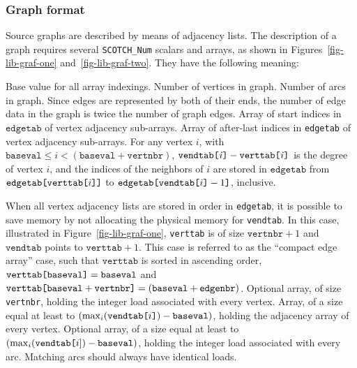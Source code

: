 \subsubsection{Graph format}
\label{sec-lib-format-graph}

Source graphs are described by means of adjacency lists. The
description of a graph requires several {\tt SCOTCH\_Num} scalars and
arrays, as shown in Figures~\ref{fig-lib-graf-one}
and~\ref{fig-lib-graf-two}. They have the following meaning:
\begin{itemize}
\iteme[{\tt baseval}]
Base value for all array indexings.
\iteme[{\tt vertnbr}]
Number of vertices in graph.
\iteme[{\tt edgenbr}]
Number of arcs in graph. Since edges are represented by both of their
ends, the number of edge data in the graph is twice the number of
graph edges.
\iteme[{\tt verttab}]
Array of start indices in $\mathtt{edgetab}$ of vertex adjacency
sub-arrays.
\iteme[{\tt vendtab}]
Array of after-last indices in {\tt edgetab} of vertex adjacency
sub-arrays.
For any vertex $i$, with $\mathtt{baseval} \leq i < (\mathtt{baseval}
+ \mathtt{vertnbr})$, $\mathtt{vendtab}\mbox{\tt [}\mathit{i}\mbox{\tt
]} - \mathtt{verttab}\mbox{\tt [}\mathit{i}\mbox{\tt ]}$ is the degree
of vertex $i$, and the indices of the neighbors of $i$ are stored in
$\mathtt{edgetab}$ from $\mathtt{edgetab}\lbt \mbox{\tt
[}\mathtt{verttab}\mbox{\tt [}i\mbox{\tt ]]}$ to
$\mathtt{edgetab}\lbt \mbox{\tt [}\mathtt{vendtab}\mbox{\tt
[}i\mbox{\tt ]} - 1\mbox{\tt ]}$, inclusive.

When all vertex adjacency lists are stored in order in {\tt edgetab},
it is possible to save memory by not allocating the physical memory
for {\tt vendtab}. In this case, illustrated in
Figure~\ref{fig-lib-graf-one}, {\tt verttab} is of size
$\mathtt{vertnbr} + 1$ and $\mathtt{vendtab}$ points to
$\mathtt{verttab} + 1$. This case is referred to as the ``compact edge
array'' case, such that $\mathtt{verttab}$ is sorted in ascending
order, $\mathtt{verttab}\mbox{\tt [}\lbt\mathtt{baseval}\mbox{\tt ]} =
\mathtt{baseval}$ and $\mathtt{verttab}\lbt\mbox{\tt
[}\mathtt{baseval} + \mathtt{vertnbr}\mbox{\tt ]} =
(\mathtt{baseval} + \mathtt{edgenbr})$.
\iteme[{\tt velotab}]
Optional array, of size {\tt vertnbr}, holding the integer load
associated with every vertex.
\iteme[{\tt edgetab}]
Array, of a size equal at least to
$\left(\max_{i}(\mathtt{vendtab}\mbox{\tt [}i\mbox{\tt ]}) -
\mathtt{baseval}\right)$, holding the adjacency array of every
vertex.
\iteme[{\tt edlotab}]
Optional array, of a size equal at least to $\left(\max_{i}(\mbox{\tt
vendtab[} i \mathtt{]}) - \mathtt{baseval}\right)$, holding the
integer load associated with every arc. Matching arcs should always
have identical loads.
\end{itemize}

